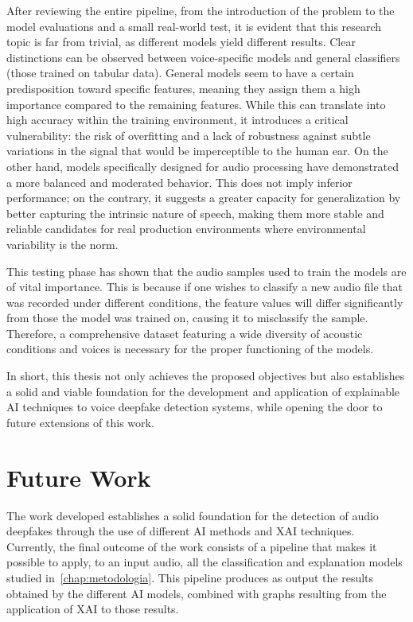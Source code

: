 After reviewing the entire pipeline, from the introduction of the problem to the model evaluations and a small real-world test, it is evident that this research topic is far from trivial, as different models yield different results. Clear distinctions can be observed between voice-specific models and general classifiers (those trained on tabular data). General models seem to have a certain predisposition toward specific features, meaning they assign them a high importance compared to the remaining features. While this can translate into high accuracy within the training environment, it introduces a critical vulnerability: the risk of overfitting and a lack of robustness against subtle variations in the signal that would be imperceptible to the human ear. On the other hand, models specifically designed for audio processing have demonstrated a more balanced and moderated behavior. This does not imply inferior performance; on the contrary, it suggests a greater capacity for generalization by better capturing the intrinsic nature of speech, making them more stable and reliable candidates for real production environments where environmental variability is the norm.

This testing phase has shown that the audio samples used to train the models are of vital importance. This is because if one wishes to classify a new audio file that was recorded under different conditions, the feature values will differ significantly from those the model was trained on, causing it to misclassify the sample. Therefore, a comprehensive dataset featuring a wide diversity of acoustic conditions and voices is necessary for the proper functioning of the models.

In short, this thesis not only achieves the proposed objectives but also establishes a solid and viable foundation for the development and application of explainable AI techniques to voice deepfake detection systems, while opening the door to future extensions of this work.

\section*{Future Work}

The work developed establishes a solid foundation for the detection of audio deepfakes through the use of different AI methods and XAI techniques.
Currently, the final outcome of the work consists of a pipeline that makes it possible to apply, to an input audio, all the classification and explanation models studied in~\autoref{chap:metodologia}. This pipeline produces as output the results obtained by the different AI models, combined with graphs resulting from the application of XAI to those results.

